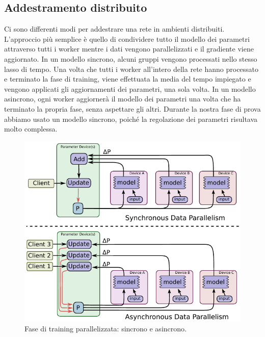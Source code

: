 \documentclass[DIV=calc, paper=a4, fontsize=11pt]{scrartcl}	 %
\begin{document}
\begin{multicols}{2}
			\subsection{Addestramento distribuito}
				Ci sono differenti modi per addestrare una rete in ambienti distribuiti. L'approccio più semplice è quello di condividere tutto il modello dei parametri attraverso tutti i worker mentre i dati vengono parallelizzati e il gradiente viene aggiornato. In un modello sincrono, alcuni gruppi vengono processati nello stesso lasso di tempo. Una volta che tutti i worker all'intero della rete hanno processato e terminato la fase di training, viene effettuata la media del tempo impiegato e vengono applicati gli aggiornamenti dei parametri, una sola volta. In un modello asincrono, ogni worker aggiornerà il modello dei parametri una volta che ha terminato la propria fase, senza aspettare gli altri. Durante la nostra fase di prova abbiamo usato un modello sincrono, poiché la regolazione dei parametri risultava molto complessa.
				\begin{figure}[H]
				\centering
				\includegraphics[scale=.55]{img/sync-async.png}
				\caption{Fase di training parallelizzata: sincrono e asincrono.}
				\label{fig:computation}
				\end{figure}

\end{multicols}
\end{document}
